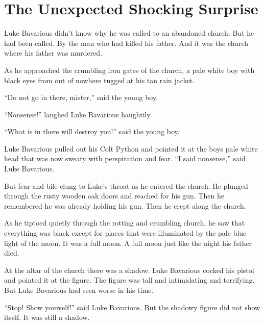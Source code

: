 \chapter[The Surprise]{The Unexpected Shocking Surprise}





Luke Bavarious didn't know why he was called to an abandoned
church. But he had been called. By the man who had killed his
father. And it was the church where his father was murdered.



As he approached the crumbling iron gates of the church, a pale
white boy with black eyes from out of nowhere tugged at his tan
rain jacket.



``Do not go in there, mister,'' said the young boy.



``Nonsense!'' laughed Luke Bavarious haughtily.



``What is in there will destroy you!'' said the young
boy.



Luke Bavarious pulled out his Colt Python and pointed it at the
boys pale white head that was now sweaty with perspiration and
fear. ``I said nonsense,'' said Luke Bavarious.



But fear and bile clung to Luke's throat as he entered the
church. He plunged through the rusty wooden oak doors and reached
for his gun. Then he remembered he was already holding his gun.
Then he crept along the church.



As he tiptoed quietly through the rotting and crumbling church, he saw
that everything was black except for places that were illuminated by the
pale blue light of the moon. It was a full moon. A full moon just like
the night his father died.



At the altar of the church there was a shadow. Luke Bavarious
cocked his pistol and pointed it at the figure. The figure was tall
and intimidating and terrifying. But Luke Bavarious had seen worse
in his time.



``Stop! Show yourself!'' said Luke Bavarious. But the
shadowy figure did not show itself. It was still a shadow.



